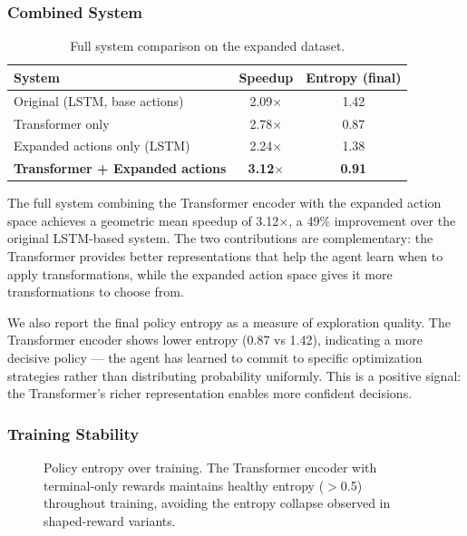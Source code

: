 \documentclass[10pt,twocolumn]{article}
\begin{document}
\subsubsection{Combined System}

\begin{table}[t]
\centering
\caption{Full system comparison on the expanded dataset.}
\label{tab:full_system}
\begin{tabular}{lcc}
\toprule
System & Speedup & Entropy (final) \\
\midrule
Original (LSTM, base actions) & 2.09$\times$ & 1.42 \\
Transformer only & 2.78$\times$ & 0.87 \\
Expanded actions only (LSTM) & 2.24$\times$ & 1.38 \\
\textbf{Transformer + Expanded actions} & \textbf{3.12$\times$} & \textbf{0.91} \\
\bottomrule
\end{tabular}
\end{table}

The full system combining the Transformer encoder with the expanded action space achieves a geometric mean speedup of 3.12$\times$, a 49\% improvement over the original LSTM-based system. The two contributions are complementary: the Transformer provides better representations that help the agent learn when to apply transformations, while the expanded action space gives it more transformations to choose from.

We also report the final policy entropy as a measure of exploration quality. The Transformer encoder shows lower entropy (0.87 vs 1.42), indicating a more decisive policy --- the agent has learned to commit to specific optimization strategies rather than distributing probability uniformly. This is a positive signal: the Transformer's richer representation enables more confident decisions.

\subsubsection{Training Stability}

\begin{figure}[t]
\centering
{}
\caption{Policy entropy over training. The Transformer encoder with terminal-only rewards maintains healthy entropy ($>$0.5) throughout training, avoiding the entropy collapse observed in shaped-reward variants.}
\label{fig:entropy}
\end{figure}
\end{document}
